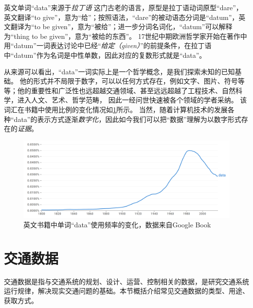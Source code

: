英文单词“data”来源于\emph{拉丁语}%
%
这门古老的语言，原型是拉丁语动词原型“dare”，英文翻译“to give”，意为“给”；按照语法，“dare”的被动语态分词是“datum”，英文翻译为“to be given”，意为“被给”；进一步分词名词化，“datum”可以解释为“thing to be given”，意为“被给的东西”。
17世纪中期欧洲哲学家开始在著作中用“datum”一词表达讨论中已经“\emph{给定（given）}”的前提条件，在拉丁语中“datum”作为名词是中性单数，因此对应的复数形式就是“data”。

从来源可以看出，“data”一词实际上是一个哲学概念，是我们探索未知的已知基础。
他的形式并不局限于数字，可以以任何方式存在，例如文字、图片、符号等等；他的重要性和广泛性也远超越交通领域、甚至远远超越了工程技术、自然科学，进入人文、艺术、哲学范畴，
因此一经问世快速被各个领域的学者采纳。
该词汇在书籍中使用比例的变化情况如\cref{fig:data-trend}所示。
当然，随着计算机技术的发展各种“data”的表示方式逐渐\emph{数字化}，因此如今我们可以把“数据”理解为以数字形式存在的\emph{证据}。

\begin{figure}
    \includegraphics[width=\linewidth]{images/data-vocabulary-trend.png}
    \caption{英文书籍中单词“data”使用频率的变化，数据来自Google Book}
    \label{fig:data-trend}
\end{figure}

\section{交通数据}

交通数据是指与交通系统的规划、设计、运营、控制相关的数据，是研究交通系统运行规律，解决现实交通问题的基础。本节概括介绍常见交通数据的类型、用途、获取方式。

